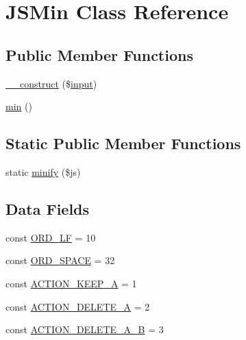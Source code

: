\hypertarget{class_j_s_min}{}\section{J\+S\+Min Class Reference}
\label{class_j_s_min}
\subsection*{Public Member Functions}
\begin{DoxyCompactItemize}
\item 
\hyperlink{class_j_s_min_ade22206ffe41068eed8c5a35952f7543}{\+\_\+\+\_\+construct} (\$\hyperlink{ossn_8lib_8input_8php_a64ebee98b041c4f75f71ed3cd73cc8ed}{input})
\item 
\hyperlink{class_j_s_min_a0bb962b33915e2c1a507e95798a453a6}{min} ()
\end{DoxyCompactItemize}
\subsection*{Static Public Member Functions}
\begin{DoxyCompactItemize}
\item 
static \hyperlink{class_j_s_min_a3a83b0020e30f40e82dcf9ab4c24c822}{minify} (\$js)
\end{DoxyCompactItemize}
\subsection*{Data Fields}
\begin{DoxyCompactItemize}
\item 
const \hyperlink{class_j_s_min_a98f6ca84ead290a98d78d5af97f3b0b3}{O\+R\+D\+\_\+\+LF} = 10
\item 
const \hyperlink{class_j_s_min_ae1d4e1296e34ef6f2ca1afd327ec3d9c}{O\+R\+D\+\_\+\+S\+P\+A\+CE} = 32
\item 
const \hyperlink{class_j_s_min_afba9736b01286c04ae584370282baa29}{A\+C\+T\+I\+O\+N\+\_\+\+K\+E\+E\+P\+\_\+A} = 1
\item 
const \hyperlink{class_j_s_min_adb0de6d559c4d935f62fcaa0bf80a55d}{A\+C\+T\+I\+O\+N\+\_\+\+D\+E\+L\+E\+T\+E\+\_\+A} = 2
\item 
const \hyperlink{class_j_s_min_a95439dfa2ad58ee0dc891dfe5f26cbc0}{A\+C\+T\+I\+O\+N\+\_\+\+D\+E\+L\+E\+T\+E\+\_\+\+A\+\_\+B} = 3
\end{DoxyCompactItemize}
